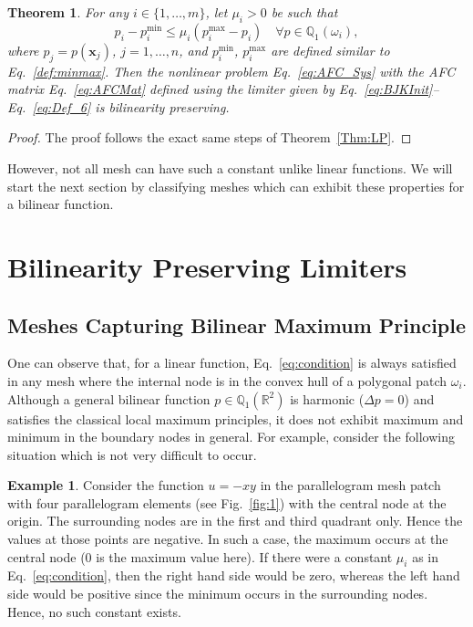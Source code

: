 \documentclass[a4paper]{article}
\theoremstyle{plain}
\newtheorem{theorem}[lemma]{Theorem}
\theoremstyle{definition}
\newtheorem{example}[lemma]{Example}
\theoremstyle{remark}
\begin{document}
\begin{theorem}	
For any $i \in \{1, \dots, m\}$, let $\mu_i > 0$ be such that
	\begin{equation}
		p_i - p_i^{\min} \le \mu_i (p_i^{\max} - p_i) \quad \forall p \in \mathbb{Q}_1(\omega_i), \label{eq:conditionQ_1}
	\end{equation}
where $p_j = p(\mathbf{x}_j)$, $j = 1, \dots, n$, and $p_i^{\min}$, $p_i^{\max}$ are defined similar to Eq.~\eqref{def:minmax}. Then the nonlinear problem Eq.~\eqref{eq:AFC_Sys} with the AFC matrix Eq.~\eqref{eq:AFCMat} defined using the limiter given by Eq.~\eqref{eq:BJKInit}--Eq.~\eqref{eq:Def_6} is bilinearity preserving.	\label{Cor:BLP}	
\end{theorem}
\begin{proof}
	The proof follows the exact same steps of Theorem~\ref{Thm:LP}.
\end{proof}

However, not all mesh can have such a constant unlike linear functions. We will start the next section by classifying meshes which can exhibit these properties for a bilinear function.
\section{Bilinearity Preserving Limiters }\label{sec:bilinear}
\subsection{Meshes Capturing Bilinear Maximum Principle }\label{sec:meshclass}

One can observe that, for a linear function, Eq.~\eqref{eq:condition} is always satisfied in any mesh where the internal node is in the convex hull of a polygonal patch $\omega_i$. Although a general bilinear function $p \in \mathbb{Q}_1(\mathbb{R}^2)$ is harmonic ($\Delta p = 0$) and satisfies the classical local maximum principles, it does not exhibit maximum and minimum in the boundary nodes in general. For example, consider the following situation which is not very difficult to occur. 

\begin{example}\label{ex:counterexample}
Consider the function $u = -xy$ in the parallelogram mesh patch with four parallelogram elements (see Fig.~\ref{fig:1}) with the central node at the origin. The surrounding nodes are in the first and third quadrant only. Hence the values at those points are negative. In such a case, the maximum occurs at the central node (0 is the maximum value here). If there were a constant $\mu_i$ as in Eq.~\eqref{eq:condition}, then the right hand side would be zero, whereas the left hand side would be positive since the minimum occurs in the surrounding nodes. Hence, no such constant exists.\label{CounterExample}
\end{example}	
\end{document}
